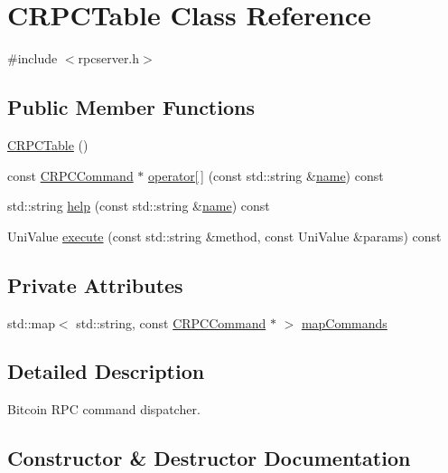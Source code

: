 \hypertarget{class_c_r_p_c_table}{}\section{C\+R\+P\+C\+Table Class Reference}
\label{class_c_r_p_c_table}


{\ttfamily \#include $<$rpcserver.\+h$>$}

\subsection*{Public Member Functions}
\begin{DoxyCompactItemize}
\item 
\mbox{\hyperlink{class_c_r_p_c_table_a2e6e624bae4c149db2f5cbe0de84b121}{C\+R\+P\+C\+Table}} ()
\item 
const \mbox{\hyperlink{class_c_r_p_c_command}{C\+R\+P\+C\+Command}} $\ast$ \mbox{\hyperlink{class_c_r_p_c_table_aa06a59b1f7fe34668eab9a6a4a2491fa}{operator\mbox{[}$\,$\mbox{]}}} (const std\+::string \&\mbox{\hyperlink{rest_8cpp_a8f8f80d37794cde9472343e4487ba3eb}{name}}) const
\item 
std\+::string \mbox{\hyperlink{class_c_r_p_c_table_a3d9af8e5975ee8d872b49992faae3ba6}{help}} (const std\+::string \&\mbox{\hyperlink{rest_8cpp_a8f8f80d37794cde9472343e4487ba3eb}{name}}) const
\item 
Uni\+Value \mbox{\hyperlink{class_c_r_p_c_table_a30bfd77e85ecc56b58da3f8582af1ac8}{execute}} (const std\+::string \&method, const Uni\+Value \&params) const
\end{DoxyCompactItemize}
\subsection*{Private Attributes}
\begin{DoxyCompactItemize}
\item 
std\+::map$<$ std\+::string, const \mbox{\hyperlink{class_c_r_p_c_command}{C\+R\+P\+C\+Command}} $\ast$ $>$ \mbox{\hyperlink{class_c_r_p_c_table_abe193d7f72d98048f2a99ec13028f65f}{map\+Commands}}
\end{DoxyCompactItemize}


\subsection{Detailed Description}
Bitcoin R\+PC command dispatcher. 

\subsection{Constructor \& Destructor Documentation}
\mbox{\label{class_c_r_p_c_table_a2e6e624bae4c149db2f5cbe0de84b121}} 
